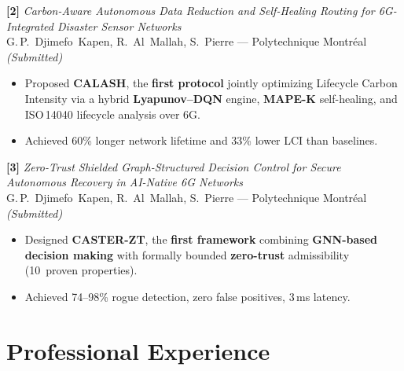 \documentclass[10pt,a4paper,sans]{moderncv}
\begin{document}
\vspace{0.4em}
\textbf{[2]} \textit{Carbon-Aware Autonomous Data Reduction and Self-Healing
Routing for 6G-Integrated Disaster Sensor Networks}\\
G.\,P.~Djimefo~Kapen, R.~Al~Mallah, S.~Pierre --- Polytechnique
Montréal \hfill \textit{(Submitted)}
\begin{itemize}[leftmargin=1.5em, topsep=2pt, itemsep=0pt, parsep=0pt]
  \item Proposed \textbf{CALASH}, the \textbf{first protocol} jointly optimizing
        Lifecycle Carbon Intensity via a hybrid \textbf{Lyapunov--DQN} engine,
        \textbf{MAPE-K} self-healing, and ISO\,14040 lifecycle analysis over 6G.
  \item Achieved 60\% longer network lifetime and 33\% lower LCI than baselines.
\end{itemize}

\vspace{0.4em}
\textbf{[3]} \textit{Zero-Trust Shielded Graph-Structured Decision Control for
Secure Autonomous Recovery in AI-Native 6G Networks}\\
G.\,P.~Djimefo~Kapen, R.~Al~Mallah, S.~Pierre --- Polytechnique
Montréal \hfill \textit{(Submitted)}
\begin{itemize}[leftmargin=1.5em, topsep=2pt, itemsep=0pt, parsep=0pt]
  \item Designed \textbf{CASTER-ZT}, the \textbf{first framework} combining
        \textbf{GNN-based decision making} with formally bounded
        \textbf{zero-trust} admissibility (10~proven properties).
  \item Achieved 74--98\% rogue detection, zero false positives, 3\,ms latency.
\end{itemize}

\section{Professional Experience}

\end{document}

